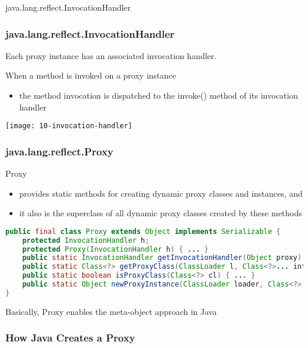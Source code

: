 java.lang.reflect.InvocationHandler

\subsubsection{java.lang.reflect.InvocationHandler}

Each proxy instance has an associated invocation handler.

When a method is invoked on a proxy instance

\begin{itemize}
	\item the method invocation is dispatched to the invoke() method of its invocation handler
\end{itemize}

\begin{center}
\texttt{[image: 10-invocation-handler]}
\end{center}

\subsubsection{java.lang.reflect.Proxy}

Proxy

\begin{itemize}
	\item  provides static methods for creating dynamic proxy classes and instances, and
	\item  it also is the superclass of all dynamic proxy classes created by these methods
\end{itemize}

\begin{lstlisting}[language=Java]
public final class Proxy extends Object implements Serializable {
	protected InvocationHandler h;
	protected Proxy(InvocationHandler h) { ... }
	public static InvocationHandler getInvocationHandler(Object proxy) { ... }
	public static Class<?> getProxyClass(ClassLoader l, Class<?>... interfaces) { ... }
	public static boolean isProxyClass(Class<?> cl) { ... }
	public static Object newProxyInstance(ClassLoader loader, Class<?>[] interfaces, InvocationHandler h ) { ... }
}
\end{lstlisting}

Basically, Proxy enables the meta-object approach in Java

\subsubsection{How Java Creates a Proxy}

